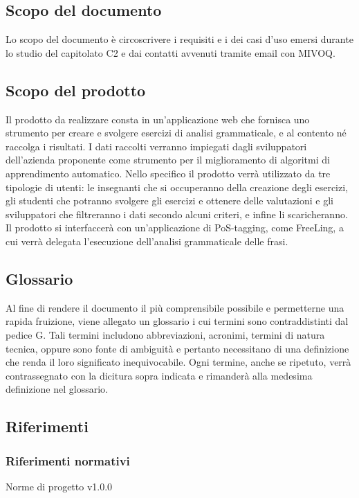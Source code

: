 \subsection{Scopo del documento}
Lo scopo del documento è circoscrivere i requisiti e i dei casi d’uso emersi durante lo studio del capitolato C2 e dai contatti avvenuti tramite email con MIVOQ.
\subsection{Scopo del prodotto}
Il prodotto da realizzare consta in un’applicazione web che fornisca uno strumento per creare e svolgere esercizi di analisi grammaticale, e al contento né raccolga i risultati. I dati raccolti verranno impiegati dagli sviluppatori dell’azienda proponente come strumento per il miglioramento di algoritmi di {apprendimento automatico}. Nello specifico il prodotto verrà utilizzato da tre tipologie di utenti:
le insegnanti che si occuperanno della creazione degli esercizi,
gli studenti che potranno svolgere gli esercizi e ottenere delle valutazioni e  
gli sviluppatori che filtreranno i dati secondo alcuni criteri, e infine li scaricheranno.\\Il prodotto si interfaccerà con un’applicazione di PoS-tagging, come FreeLing, a cui verrà delegata l’esecuzione dell’analisi grammaticale delle frasi.
\subsection{Glossario}
Al fine di rendere il documento il più comprensibile possibile e permetterne una rapida fruizione, viene allegato un glossario i cui termini sono contraddistinti dal pedice G. Tali termini includono abbreviazioni, acronimi, termini di natura tecnica, oppure sono fonte di ambiguità e pertanto necessitano di una definizione che renda il loro significato inequivocabile. 
Ogni termine, anche se ripetuto, verrà contrassegnato con la dicitura sopra indicata e rimanderà alla medesima definizione nel glossario.
\subsection{Riferimenti}
\subsubsection{Riferimenti normativi}
Norme di progetto v1.0.0
